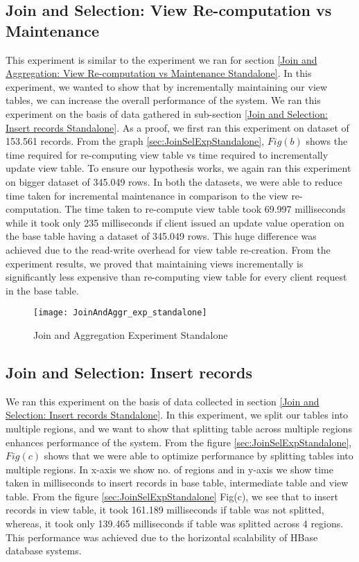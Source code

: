 \documentclass[11pt,a4paper,bibtotoc,idxtotoc,headsepline,footsepline,footexclude,BCOR12mm,DIV13]{scrbook}
\begin{document}
\subsection{Join and Selection: View Re-computation vs Maintenance}
\label{Join and Selection: View Re-computation vs Maintenance Standalone}

This experiment is similar to the experiment we ran for section \ref{Join and Aggregation: View Re-computation vs Maintenance Standalone}. In this experiment, we wanted to show that by incrementally maintaining our view tables, we can increase the overall performance of the system. We ran this experiment on the basis of data gathered in sub-section \ref{Join and Selection: Insert records Standalone}. As a proof, we first ran this experiment on dataset of 153.561 records. From the graph \ref{sec:JoinSelExpStandalone}, $Fig(b)$ shows the time required for re-computing view table vs time required to incrementally update view table. To ensure our hypothesis works, we again ran this experiment on bigger dataset of 345.049 rows. In both the datasets, we were able to reduce time taken for incremental maintenance in comparison to the view re-computation. The time taken to re-compute view table took 69.997 milliseconds while it took only 235 milliseconds if client issued an update value operation on the base table having a dataset of 345.049 rows. This huge difference was achieved due to the read-write overhead for view table re-creation. From the experiment results, we proved that maintaining views incrementally is significantly less expensive than re-computing view table for every client request in the base table.

\begin{figure}
	\centering
	\texttt{[image: JoinAndAggr\_exp\_standalone]}
	\caption{Join and Aggregation Experiment Standalone}
	\label{sec:JoinAggrExpStandalone}
	
\end{figure} 
\newpage

\subsection{Join and Selection: Insert records}
\label{Join and Selection: Insert Records Standalone}

We ran this experiment on the basis of data collected in section \ref{Join and Selection: Insert records Standalone}. In this experiment, we split our tables into multiple regions, and we want to show that splitting table across multiple regions enhances performance of the system. From the figure \ref{sec:JoinSelExpStandalone}, $Fig(c)$ shows that we were able to optimize performance by splitting tables into multiple regions. In x-axis we show no. of regions and in y-axis we show time taken in milliseconds to insert records in base table, intermediate table and view table. From the figure \ref{sec:JoinSelExpStandalone} Fig(c), we see that to insert records in view table, it took 161.189 milliseconds if table was not splitted, whereas, it took only 139.465 milliseconds if table was splitted across 4 regions. This performance was achieved due to the horizontal scalability of HBase database systems. 
\end{document}

